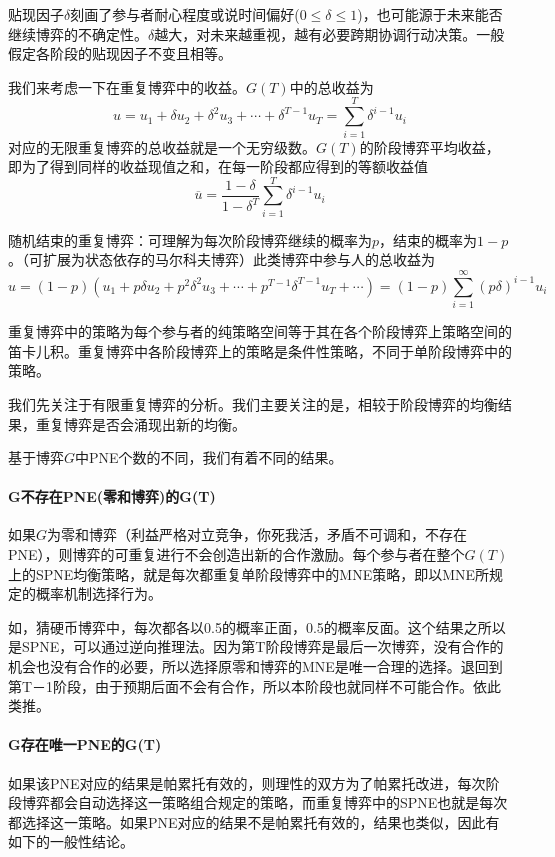 \documentclass[UTF8,12pt]{ctexart}
\numberwithin{equation}{section} %
\numberwithin{figure}{section}
\numberwithin{table}{section}
\begin{document}
	贴现因子$\delta$刻画了参与者耐心程度或说时间偏好($0 \leqslant \delta \leqslant 1$)，也可能源于未来能否继续博弈的不确定性。$\delta$越大，对未来越重视，越有必要跨期协调行动决策。一般假定各阶段的贴现因子不变且相等。
	
	我们来考虑一下在重复博弈中的收益。$G(T)$中的总收益为
	\begin{equation}
		u = u_1 + \delta u_2 + \delta^2 u_3 + \cdots + \delta^{T-1}u_T = \sum_{i=1}^{T}\delta^{i-1}u_i
	\end{equation}
	对应的无限重复博弈的总收益就是一个无穷级数。$G(T)$的阶段博弈平均收益，即为了得到同样的收益现值之和，在每一阶段都应得到的等额收益值 
	\begin{equation}
		\overline{u} = \frac{1-\delta}{1-\delta^T}\sum_{i=1}^{T}\delta^{i-1}u_i
	\end{equation}
	
	随机结束的重复博弈：可理解为每次阶段博弈继续的概率为$p$，结束的概率为$1-p$。（可扩展为状态依存的马尔科夫博弈）此类博弈中参与人的总收益为
	\begin{equation}
		u = (1-p)(u_1 + p \delta u_2 + p^2 \delta^2 u_3 + \cdots + p^{T-1} \delta^{T-1} u_T + \cdots) = (1-p)\sum_{i=1}^{\infty}(p \delta)^{i-1}u_i
	\end{equation}
	
	重复博弈中的策略为每个参与者的纯策略空间等于其在各个阶段博弈上策略空间的笛卡儿积。重复博弈中各阶段博弈上的策略是条件性策略，不同于单阶段博弈中的策略。
	
	我们先关注于有限重复博弈的分析。我们主要关注的是，相较于阶段博弈的均衡结果，重复博弈是否会涌现出新的均衡。
	
	基于博弈$G$中PNE个数的不同，我们有着不同的结果。
	
	\paragraph{G不存在PNE(零和博弈)的G(T)}
	
	如果$G$为零和博弈（利益严格对立竞争，你死我活，矛盾不可调和，不存在PNE），则博弈的可重复进行不会创造出新的合作激励。每个参与者在整个$G(T)$上的SPNE均衡策略，就是每次都重复单阶段博弈中的MNE策略，即以MNE所规定的概率机制选择行为。
	
	如，猜硬币博弈中，每次都各以0.5的概率正面，0.5的概率反面。这个结果之所以是SPNE，可以通过逆向推理法。因为第T阶段博弈是最后一次博弈，没有合作的机会也没有合作的必要，所以选择原零和博弈的MNE是唯一合理的选择。退回到第T－1阶段，由于预期后面不会有合作，所以本阶段也就同样不可能合作。依此类推。
	
	\paragraph{G存在唯一PNE的G(T)}
	如果该PNE对应的结果是帕累托有效的，则理性的双方为了帕累托改进，每次阶段博弈都会自动选择这一策略组合规定的策略，而重复博弈中的SPNE也就是每次都选择这一策略。如果PNE对应的结果不是帕累托有效的，结果也类似，因此有如下的一般性结论。
	
\end{document}
